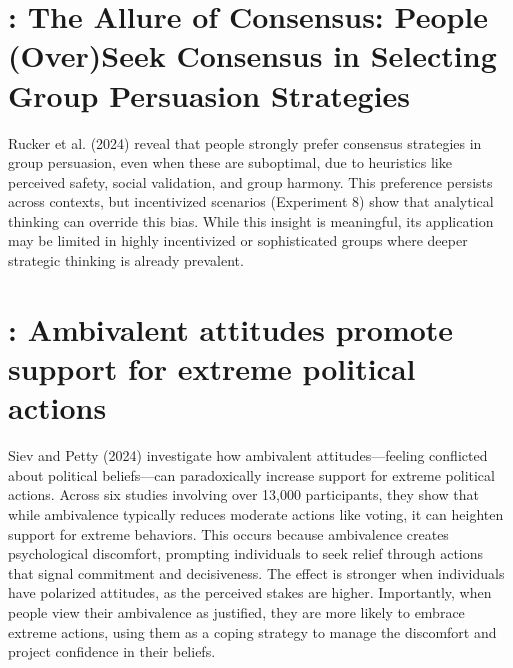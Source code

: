 \documentclass[11pt]{elegantbook}
\begin{document}
\section{\cite{rucker2024allure}: The Allure of Consensus: People (Over)Seek Consensus in Selecting Group Persuasion Strategies}
Rucker et al. (2024) reveal that people strongly prefer consensus strategies in group persuasion, even when these are suboptimal, due to heuristics like perceived safety, social validation, and group harmony. This preference persists across contexts, but incentivized scenarios (Experiment 8) show that analytical thinking can override this bias. While this insight is meaningful, its application may be limited in highly incentivized or sophisticated groups where deeper strategic thinking is already prevalent.


\section{\cite{siev2024ambivalent}: Ambivalent attitudes promote support for extreme political actions}
Siev and Petty (2024) investigate how ambivalent attitudes—feeling conflicted about political beliefs—can paradoxically increase support for extreme political actions. Across six studies involving over 13,000 participants, they show that while ambivalence typically reduces moderate actions like voting, it can heighten support for extreme behaviors. This occurs because ambivalence creates psychological discomfort, prompting individuals to seek relief through actions that signal commitment and decisiveness. The effect is stronger when individuals have polarized attitudes, as the perceived stakes are higher. Importantly, when people view their ambivalence as justified, they are more likely to embrace extreme actions, using them as a coping strategy to manage the discomfort and project confidence in their beliefs.



























































\end{document}
